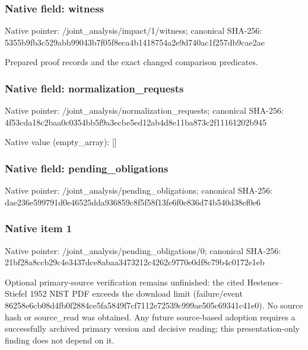 \documentclass[10pt,a4paper]{article}
\begin{document}
\subsubsection{Native field: witness}
Native pointer: /joint\_\allowbreak{}analysis/impact/1/witness; canonical SHA-256: 5355b9fb3c529abb99043b7f05f8eca4b1418754a2e9d740ac1f257db9cae2ae

\begingroup\raggedright\sloppy Prepared proof records and the exact changed comparison predicates.\par\endgroup

\subsubsection{Native field: normalization\_\allowbreak{}requests}
Native pointer: /joint\_\allowbreak{}analysis/normalization\_\allowbreak{}requests; canonical SHA-256: 4f53cda18c2baa0c0354bb5f9a3ecbe5ed12ab4d8e11ba873c2f11161202b945

Native value (empty\_\allowbreak{}array): []

\subsubsection{Native field: pending\_\allowbreak{}obligations}
Native pointer: /joint\_\allowbreak{}analysis/pending\_\allowbreak{}obligations; canonical SHA-256: dae236e599791d0e46525dda936859c8f5f58f13fe6f0e836d74b540d38ef0e6

\subsubsection{Native item 1}
Native pointer: /joint\_\allowbreak{}analysis/pending\_\allowbreak{}obligations/0; canonical SHA-256: 21bf28a8ccb29c4e3437dce8abaa3473212c4262c9770e0df8c79b4c0172e1eb

\begingroup\raggedright\sloppy Optional primary-source verification remains unfinished:\allowbreak{} the cited Hestenes{\AtlasUnicodeText –}\allowbreak{}Stiefel 1952 NIST PDF exceeds the download limit (failure/\allowbreak{}event 86258e6cb08d4fb0f2884ce5fa5849f7cf7112e72539c999ae505c69341c41e0). No source hash or source\_\allowbreak{}read was obtained. Any future source-based adoption requires a successfully archived primary version and decisive reading;\allowbreak{} this presentation-only finding does not depend on it.\par\endgroup
\end{document}
